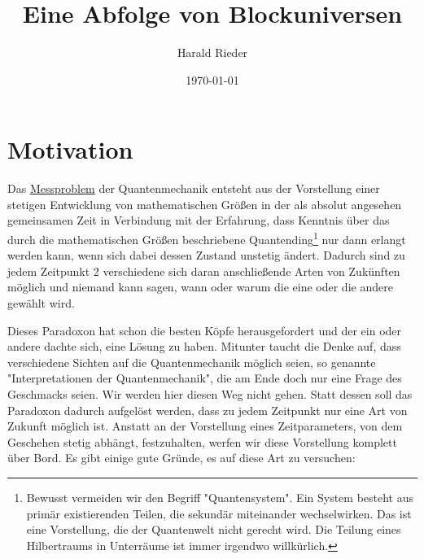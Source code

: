 \documentclass[12pt]{article}
\begin{document}
\title{\fontsize{25}{25}\selectfont \textbf{Eine Abfolge von Blockuniversen}}
\author{Harald Rieder}
\date{\today}
\maketitle



\tableofcontents

\section{Motivation}

Das \href{https://en.wikipedia.org/wiki/Measurement_problem}{Messproblem} der Quantenmechanik entsteht aus der Vorstellung einer stetigen Entwicklung von mathematischen Größen in der als absolut angesehen gemeinsamen Zeit in Verbindung mit der Erfahrung, dass Kenntnis über das durch die mathematischen Größen beschriebene Quantending\footnote{Bewusst vermeiden wir den Begriff "Quantensystem". Ein System besteht aus primär existierenden Teilen, die sekundär miteinander wechselwirken. Das ist eine Vorstellung, die der Quantenwelt nicht gerecht wird. Die Teilung eines Hilbertraums in Unterräume ist immer irgendwo willkürlich.} nur dann erlangt werden kann, wenn sich dabei dessen Zustand unstetig ändert. Dadurch sind zu jedem Zeitpunkt 2 verschiedene sich daran anschließende Arten von Zukünften möglich und niemand kann sagen, wann oder warum die eine oder die andere gewählt wird. 

Dieses Paradoxon hat schon die besten Köpfe herausgefordert und der ein oder andere dachte sich, eine Lösung zu haben. Mitunter taucht die Denke auf, dass verschiedene Sichten auf die Quantenmechanik möglich seien, so genannte "Interpretationen der Quantenmechanik", die am Ende doch nur eine Frage des Geschmacks seien. Wir werden hier diesen Weg nicht gehen. Statt dessen soll das Paradoxon dadurch aufgelöst werden, dass zu jedem Zeitpunkt nur eine Art von Zukunft möglich ist. Anstatt an der Vorstellung eines Zeitparameters, von dem Geschehen stetig abhängt, festzuhalten, werfen wir diese Vorstellung komplett über Bord. Es gibt einige gute Gründe, es auf diese Art zu versuchen:
\end{document}
